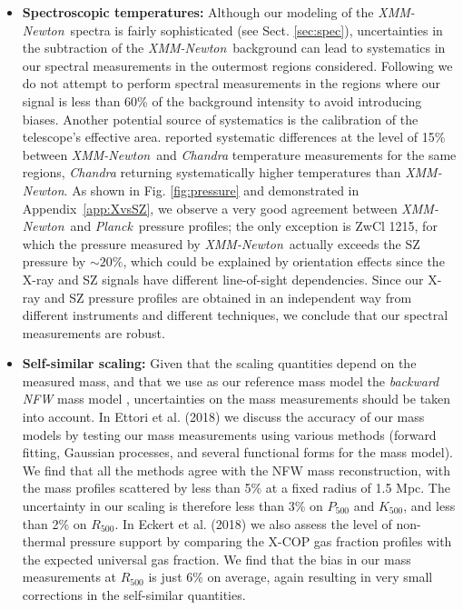 \documentclass[traditabstract   ]{aa} %
\newcommand{\xmm}{{\it XMM-Newton}}
\newcommand{\planck}{{\it Planck}}
\begin{document}
\begin{itemize}
\item \textbf{Spectroscopic temperatures:} Although our modeling of the \xmm\ spectra is fairly sophisticated (see Sect. \ref{sec:spec}), uncertainties in the subtraction of the \xmm\ background can lead to systematics in our spectral measurements in the outermost regions considered. Following \citet{lm08} we do not attempt to perform spectral measurements in the regions where our signal is less than 60\% of the background intensity to avoid introducing biases. Another potential source of systematics is the calibration of the telescope's effective area. \citet{schellenberger+15} reported systematic differences at the level of 15\% between \xmm\ and \emph{Chandra} temperature measurements for the same regions, \emph{Chandra} returning systematically higher temperatures than \xmm. As shown in Fig. \ref{fig:pressure} and demonstrated in Appendix~\ref{app:XvsSZ}, we observe a very good agreement between \xmm\ and \planck\ pressure profiles; the only exception is ZwCl 1215, for which the pressure measured by \xmm\ actually {exceeds} the SZ pressure by $\sim20\%$, which could be explained by orientation effects since the X-ray and SZ signals have different line-of-sight dependencies. Since our X-ray and SZ pressure profiles are obtained in an independent way from different instruments and different techniques, we conclude that our spectral measurements are robust.

\item \textbf{Self-similar scaling: }Given that the scaling quantities depend on the measured mass, and that we use as our reference mass model the \textit{backward NFW} mass model \citep{ettori+10,ghirardini18}, uncertainties on the mass measurements should be taken into account. In Ettori et al. (2018) we discuss the accuracy of our mass models by testing our mass measurements using various methods (forward fitting, Gaussian processes, and several functional forms for the mass model). We find that all the methods agree with the NFW mass reconstruction, with the mass profiles scattered by less than 5\% at a fixed radius of 1.5 Mpc. The uncertainty in our scaling is therefore less than 3\% on $P_{500}$ and $K_{500}$, and less than 2\% on $R_{500}$. In Eckert et al. (2018) we also assess the level of non-thermal pressure support by comparing the X-COP gas fraction profiles with the expected universal gas fraction. We find that the bias in our mass measurements at $R_{500}$ is just 6\% on average, again resulting in very small corrections in the self-similar quantities. 


\end{itemize}
\end{document}
